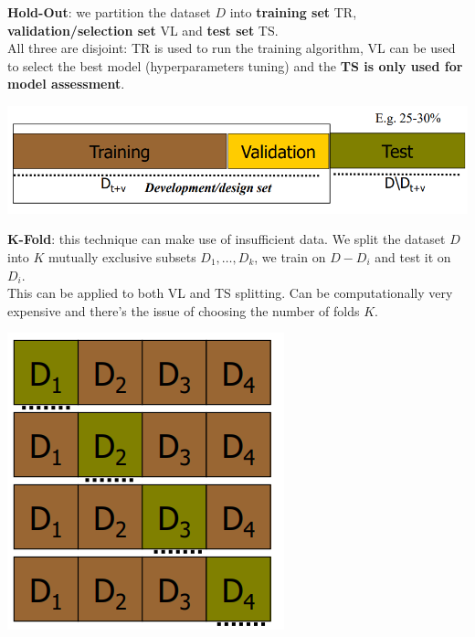 \documentclass[10pt]{report}
\begin{document}
\begin{list}{}{}
	\item \textbf{Hold-Out}: we partition the dataset $D$ into \textbf{training set} TR, \textbf{validation/selection set} VL and \textbf{test set} TS.\\
	All three are disjoint: TR is used to run the training algorithm, VL can be used to select the best model (hyperparameters tuning) and the \textbf{TS is only used for model assessment}.
	\begin{center}
		\includegraphics[scale=0.5]{2.png}
	\end{center}
	\item \begin{multicols}{2}
	\textbf{K-Fold}: this technique can make use of insufficient data. We split the dataset $D$ into $K$ mutually exclusive subsets $D_1,\ldots, D_k$, we train on $D - D_i$ and test it on $D_i$.\\
	This can be applied to both VL and TS splitting. Can be computationally very expensive and there's the issue of choosing the number of folds $K$.
	\begin{center}
		\includegraphics[scale=0.5]{3.png}
	\end{center}
	\end{multicols}
\end{list}
\pagebreak
\end{document}
